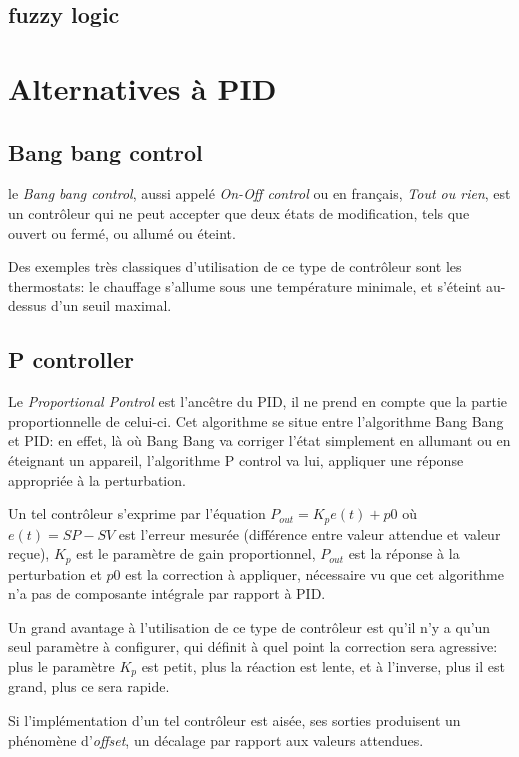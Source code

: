 \subsection{fuzzy logic}

\section{Alternatives à PID}

\subsection{Bang bang control}
le \emph{Bang bang control}, aussi appelé \emph{On-Off control} ou en français, \emph{Tout ou rien}, est un contrôleur qui ne peut accepter que deux états de modification, tels que ouvert ou fermé, ou allumé ou éteint.

Des exemples très classiques d'utilisation de ce type de contrôleur sont les thermostats: le chauffage s'allume sous une température minimale, et s'éteint au-dessus d'un seuil maximal.

\subsection{P controller}
Le \emph{Proportional Pontrol} est l'ancêtre du PID, il ne prend en compte que la partie proportionnelle de celui-ci. Cet algorithme se situe entre l'algorithme Bang Bang et PID: en effet, là où Bang Bang va corriger l'état simplement en allumant ou en éteignant un appareil, l'algorithme P control va lui, appliquer une réponse appropriée à la perturbation.

Un tel contrôleur s'exprime par l'équation $P_{out} = K_{p}e(t) + p0$ où $e(t) = SP - SV$ est l'erreur mesurée (différence entre valeur attendue et valeur reçue), $K_{p}$ est le paramètre de gain proportionnel, $P_{out}$ est la réponse à la perturbation et $p0$ est la correction à appliquer, nécessaire vu que cet algorithme n'a pas de composante intégrale par rapport à PID.

Un grand avantage à l'utilisation de ce type de contrôleur est qu'il n'y a qu'un seul paramètre à configurer, qui définit à quel point la correction sera agressive: plus le paramètre $K_{p}$ est petit, plus la réaction est lente, et à l'inverse, plus il est grand, plus ce sera rapide.

Si l'implémentation d'un tel contrôleur est aisée, ses sorties produisent un phénomène d'\emph{offset}, un décalage par rapport aux valeurs attendues.


